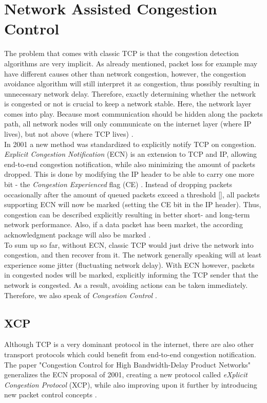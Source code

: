 \documentclass[a4paper,conference]{IEEEtran}
\begin{document}
\section{Network Assisted Congestion Control}
The problem that comes with classic TCP is that the congestion detection algorithms are very implicit. As already mentioned, packet loss for example may have different causes other than network congestion, however, the congestion avoidance algorithm will still interpret it as congestion, thus possibly resulting in unnecessary network delay. Therefore, exactly determining whether the network is congested or not is crucial to keep a network stable. Here, the network layer comes into play. Because most communication should be hidden along the packets path, all network nodes will only communicate on the internet layer (where IP lives), but not above (where TCP lives) \cite{ramakrishnan1999proposal}.\\
In 2001 a new method was standardized to explicitly notify TCP on congestion. \textit{Explicit Congestion Notification} (ECN) is an extension to TCP and IP, allowing end-to-end congestion notification, while also minimizing the amount of packets dropped. This is done by modifying the IP header to be able to carry one more bit - the \textit{Congestion Experienced} flag (CE) \cite{ramakrishnan1999proposal}. Instead of dropping packets occasionally after the amount of queued packets exceed a threshold [], all packets supporting ECN will now be marked (setting the CE bit in the IP header). Thus, congestion can be described explicitly resulting in better short- and long-term network performance. Also, if a data packet has been market, the according acknowledgment package will also be marked \cite{ramakrishnan1999proposal,ramakrishnan2001addition,10.1145/205511.205512}.\\
To sum up so far, without ECN, classic TCP would just drive the network into congestion, and then recover from it. The network generally speaking will at least experience some jitter (fluctuating network delay). With ECN however, packets in congested nodes will be marked, explicitly informing the TCP sender that the network is congested. As a result, avoiding actions can be taken immediately. Therefore, we also speak of \textit{Congestion Control} \cite{ramakrishnan1999proposal,ramakrishnan2001addition}.

\subsection{XCP}
Although TCP is a very dominant protocol in the internet, there are also other transport protocols which could benefit from end-to-end congestion notification. The paper "Congestion Control for High Bandwidth-Delay Product Networks"  generalizes the ECN proposal of 2001, creating a new protocol called \textit{eXplicit Congestion Protocol} (XCP), while also improving upon it further by introducing new packet control concepts \cite{katabi2002congestion,1498331}.
\end{document}
